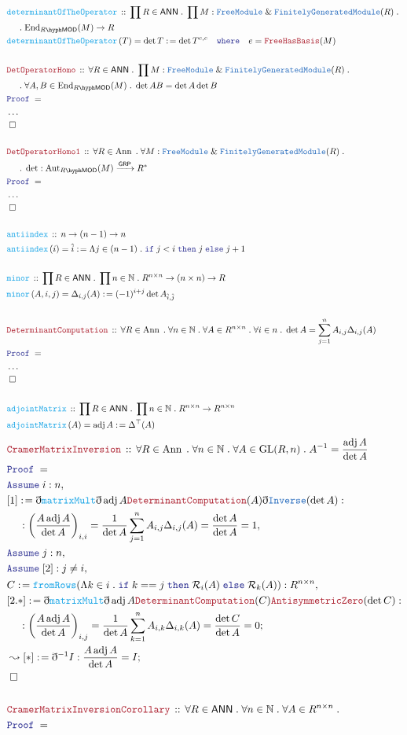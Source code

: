 \documentclass[12pt]{scrartcl}
\newcommand{\TYPE}[1]{\textcolor{NavyBlue}{\mathtt{#1}}}
\newcommand{\FUNC}[1]{\textcolor{Cerulean}{\mathtt{#1}}}
\newcommand{\LOGIC}[1]{\textcolor{Blue}{\mathtt{#1}}}
\newcommand{\THM}[1]{\textcolor{Maroon}{\mathtt{#1}}}
\renewcommand{\.}{\; . \;}
\newcommand{\de}{: \kern 0.1pc =}
\newcommand{\where}{\LOGIC{where}}
\newcommand{\If}{\LOGIC{if} \;}
\newcommand{\Then}{ \; \LOGIC{then} \;}
\newcommand{\Else}{\; \LOGIC{else} \;}
\newcommand{\Act}[1]{\left(#1\right)}
\newcommand{\Theorem}[2]{& \THM{#1} \, :: \, #2 \\ & \Proof = \\ }
\newcommand{\DeclareFunc}[2]{& \FUNC{#1} \, :: \, #2 \\}
\newcommand{\DefineNamedFunc}[4]{&  \FUNC{#1}\Act{#2} = #3 \de #4 \\}
\newcommand{\NewLine}{\\ & \kern 1pc}
\newcommand{\Page}[1]{ \begin{align*} #1 \end{align*}   }
\newcommand{ \bd }{ \ByDef }
\newcommand{\NoProof}{ & \ldots \\ \EndProof}
\renewcommand{\And}{\; \& \;}
\newcommand{\Nat}{\mathbb{N} }
\newcommand{\Aut}{\mathrm{Aut}}
\newcommand{\End}{\mathrm{End}}
\newcommand{\Say}[3]{& #1 \de #2 : #3, \\}
\newcommand{\Conclude}[3]{& #1 \de #2 : #3; \\}
\newcommand{\DeriveConclude}[3]{& \leadsto #1 \de #2 : #3 ; \\}
\newcommand{\Assume}[2]{& \LOGIC{Assume} \; #1 : #2, \\}
\newcommand{\QED}{\; \square}
\newcommand{\EndProof}{& \QED \\}
\newcommand{\ByDef}{\eth}
\newcommand{\Proof}{\LOGIC{Proof} \; }
\newcommand{\Arrow}[1]{\xrightarrow{#1}}
\newcommand{\R}{\mathcal{R}}
\newcommand{\GRP}{\mathsf{GRP}}
\newcommand{\FGM}{\TYPE{FinitelyGeneratedModule}}
\newcommand{\FM}{\TYPE{FreeModule}}
\newcommand{\GL}{\mathrm{GL}}
\DeclareMathOperator{\Ann}{Ann}
\DeclareMathOperator{\adj}{adj}
\newcommand{\LMOD}[1]{#1\hyph\mathsf{MOD}}
\newcommand{\ANN}{\mathsf{ANN}}
\begin{document}
\Page{
	\DeclareFunc{determinantOfTheOperator}{\prod R \in \ANN \. \prod M : \FM \And \FGM(R) \. \NewLine \. \End_{\LMOD{R}}(M) \to R}
	\DefineNamedFunc{determinantOfTheOperator}{T}{\det T}{\det T^{e,e} \quad \where \quad e = \THM{FreeHasBasis}(M)}
	\\
	\Theorem{DetOperatorHomo}{\forall R \in \ANN \. \prod M : \FM \And \FGM(R) \. 
		\NewLine \. 
		\forall A,B \in \End_{\LMOD{R}}(M) \. \det AB = \det A \det B}
	\NoProof
	\\
	\Theorem{DetOperatorHomo1}{
		\forall  R \in \Ann \. \forall M : \FM \And \FGM(R) \.  \NewLine \.
		\det : \Aut_{\LMOD{R}}(M) \Arrow{\GRP} R^*
	}
	\NoProof
	\\
	\DeclareFunc{antiindex}{ n \to (n-1) \to n}
	\DefineNamedFunc{antiindex}{i}{\hat i}{\Lambda j \in (n-1) \. \If j < i \Then j \Else j + 1}
	\\
	\DeclareFunc{minor}{\prod R \in \ANN \. \prod n \in \Nat \. R^{n \times n} \to (n \times n) \to R }
	\DefineNamedFunc{minor}{A,i,j}{\Delta_{i,j}(A)}{(-1)^{i+j}\det A_{\hat i,\hat j}}
	\\
	\Theorem{DeterminantComputation}{
		\forall R \in \Ann \. 
		\forall n \in \Nat \. 
		\forall A \in R^{n \times n} \.  
		\forall i \in n \.
		\det A  = \sum_{j=1}^n A_{i,j} \Delta_{i,j}(A)
	}
	\NoProof
	\\
	\DeclareFunc{adjointMatrix}{\prod R \in \ANN \. \prod n \in \Nat \. R^{n \times n} \to R^{n \times n}}
	\DefineNamedFunc{adjointMatrix}{A}{\adj A}{\Delta^{\top}(A)}
}\Page{
	\Theorem{CramerMatrixInversion}{
		\forall R \in \Ann \. 
		\forall n \in \Nat \. 
		\forall A \in \GL(R,n) \.
		A^{-1} = \frac{\adj A}{\det A}
	}
	\Assume{i}{n}
	\Say{[1]}{\bd \FUNC{matrixMult}\bd \adj A \THM{DeterminantComputation}(A)\bd \TYPE{Inverse}(\det A)}
	{
		\NewLine :
		\left( \frac{A\adj A}{\det A} \right)_{i,i} = 
		\frac{1}{\det A} \sum_{j=1}^n A_{i,j} \Delta_{i,j}(A) = 
		\frac{\det A}{\det A} = 1
	}
	\Assume{j}{n}
	\Assume{[2]}{j \neq i}
	\Say{C}{\FUNC{fromRows}(\Lambda k \in i \. \If k == j \Then \R_i(A) \Else \R_k(A))}{R^{n \times n}}
	\Conclude{[2.*]}{\bd \FUNC{matrixMult}\bd \adj A \THM{DeterminantComputation}(C) \THM{AntisymmetricZero}(\det C) }{  
		\NewLine :
		\left( \frac{A\adj A}{\det A} \right)_{i,j} = 
		\frac{1}{\det A} \sum_{k=1}^n A_{i,k} \Delta_{i,k}(A) = 
		\frac{\det C}{\det A} = 0
	}
	\DeriveConclude{[*]}{\bd^{-1}I}{  \frac{A \adj A}{\det A} = I }
	\EndProof
	\\
	\Theorem{CramerMatrixInversionCorollary}{\forall R \in \ANN \. \forall n \in \Nat \. \forall A \in R^{n \times n}  \. 
}}
\end{document}
